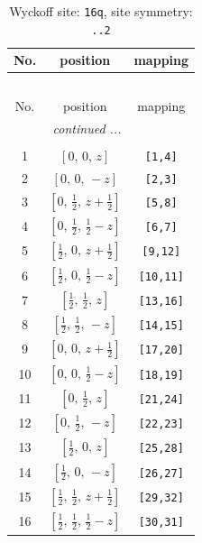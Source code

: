 \documentclass[fleqn,8pt]{jsarticle}
\begin{document}
\renewcommand{\arraystretch}{1.2}
\begin{longtable}{ccc}
\caption{Wyckoff site: {\tt 16q}, site symmetry: {\tt ..2}}
 \\
 \hline \hline
No. & position & mapping \\ \hline \endfirsthead

\multicolumn{2}{l}{\tablename\ \thetable{}} \\
 \hline \hline
No. & position & mapping \\ \hline \endhead

 \hline \hline
\multicolumn{2}{r}{\footnotesize\it continued ...} \\ \endfoot

 \hline \hline
\multicolumn{2}{r}{} \\ \endlastfoot

1 & $\left[ 0,\, 0,\, z \right]$ & {\tt [1,4]} \\ \hline
2 & $\left[ 0,\, 0,\, - z \right]$ & {\tt [2,3]} \\ \hline
3 & $\left[ 0,\, \frac{1}{2},\, z + \frac{1}{2} \right]$ & {\tt [5,8]} \\ \hline
4 & $\left[ 0,\, \frac{1}{2},\, \frac{1}{2} - z \right]$ & {\tt [6,7]} \\ \hline
5 & $\left[ \frac{1}{2},\, 0,\, z + \frac{1}{2} \right]$ & {\tt [9,12]} \\ \hline
6 & $\left[ \frac{1}{2},\, 0,\, \frac{1}{2} - z \right]$ & {\tt [10,11]} \\ \hline
7 & $\left[ \frac{1}{2},\, \frac{1}{2},\, z \right]$ & {\tt [13,16]} \\ \hline
8 & $\left[ \frac{1}{2},\, \frac{1}{2},\, - z \right]$ & {\tt [14,15]} \\ \hline
9 & $\left[ 0,\, 0,\, z + \frac{1}{2} \right]$ & {\tt [17,20]} \\ \hline
10 & $\left[ 0,\, 0,\, \frac{1}{2} - z \right]$ & {\tt [18,19]} \\ \hline
11 & $\left[ 0,\, \frac{1}{2},\, z \right]$ & {\tt [21,24]} \\ \hline
12 & $\left[ 0,\, \frac{1}{2},\, - z \right]$ & {\tt [22,23]} \\ \hline
13 & $\left[ \frac{1}{2},\, 0,\, z \right]$ & {\tt [25,28]} \\ \hline
14 & $\left[ \frac{1}{2},\, 0,\, - z \right]$ & {\tt [26,27]} \\ \hline
15 & $\left[ \frac{1}{2},\, \frac{1}{2},\, z + \frac{1}{2} \right]$ & {\tt [29,32]} \\ \hline
16 & $\left[ \frac{1}{2},\, \frac{1}{2},\, \frac{1}{2} - z \right]$ & {\tt [30,31]} \\
\end{longtable}
\end{document}
